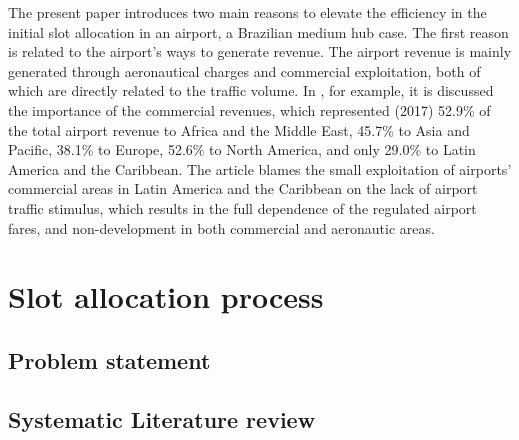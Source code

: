 \label{section:Introduction}
The present paper introduces two main reasons to elevate the efficiency in the initial slot allocation in an airport, a Brazilian medium hub case. The first reason is related to the airport's ways to generate revenue. The airport revenue is mainly generated through aeronautical charges and commercial exploitation, both of which are directly related to the traffic volume. In \cite{graham2009}, for example, it is discussed the importance of the commercial revenues, which represented (2017) 52.9\% of the total airport revenue to Africa and the Middle East, 45.7\% to Asia and Pacific, 38.1\% to Europe, 52.6\% to North America, and only 29.0\% to Latin America and the Caribbean. The article blames the small exploitation of airports' commercial areas in Latin America and the Caribbean on the lack of airport traffic stimulus, which results in the full dependence of the regulated airport fares, and non-development in both commercial and aeronautic areas.

\section{Slot allocation process}%

\subsection{Problem statement}
\subsection{Systematic Literature review}